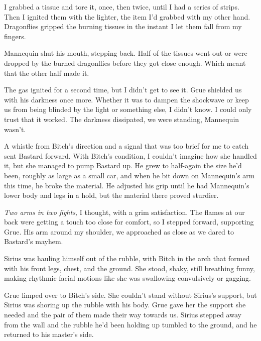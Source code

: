 I grabbed a tissue and tore it, once, then twice, until I had a series of strips.  Then I ignited them with the lighter, the item I'd grabbed with my other hand.  Dragonflies gripped the burning tissues in the instant I let them fall from my fingers.



Mannequin shut his mouth, stepping back.  Half of the tissues went out or were dropped by the burned dragonflies before they got close enough.  Which meant that the other half made it.



The gas ignited for a second time, but I didn't get to see it.  Grue shielded us with his darkness once more.  Whether it was to dampen the shockwave or keep us from being blinded by the light or something else, I didn't know.  I could only trust that it worked.  The darkness dissipated, we were standing, Mannequin wasn't.



A whistle from Bitch's direction and a signal that was too brief for me to catch sent Bastard forward.  With Bitch's condition, I couldn't imagine how she handled it, but she managed to pump Bastard up.  He grew to half-again the size he'd been, roughly as large as a small car, and when he bit down on Mannequin's arm this time, he broke the material.  He adjusted his grip until he had Mannequin's lower body and legs in a hold, but the material there proved sturdier.



\emph{Two arms in two fights,} I thought, with a grim satisfaction.  The flames at our back were getting a touch too close for comfort, so I stepped forward, supporting Grue.  His arm around my shoulder, we approached as close as we dared to Bastard's mayhem.



Sirius was hauling himself out of the rubble, with Bitch in the arch that formed with his front legs, chest, and the ground.  She stood, shaky, still breathing funny, making rhythmic facial motions like she was swallowing convulsively or gagging.



Grue limped over to Bitch's side.  She couldn't stand without Sirius's support, but Sirius was shoring up the rubble with his body.  Grue gave her the support she needed and the pair of them made their way towards us.  Sirius stepped away from the wall and the rubble he'd been holding up tumbled to the ground, and he returned to his master's side.



